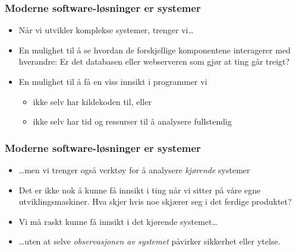 \documentclass{beamer}
\begin{document}
\begin{frame}
    \frametitle{Moderne software-løsninger er systemer}
\begin{itemize}

    \item Når vi utvikler komplekse systemer, trenger vi…

        \item En mulighet til å se hvordan de forskjellige komponentene interagerer med
        hverandre: Er det databasen eller webserveren som gjør at ting går treigt?

    \item En mulighet til å få en viss innsikt i programmer vi
        \begin{itemize}
            \item ikke selv har kildekoden til, eller
            \item ikke selv har tid og ressurser til å analysere fullstendig
            \end{itemize}

\end{itemize}
\end{frame}

\begin{frame}
    \frametitle{Moderne software-løsninger er systemer}
\begin{itemize}

    \item …men vi trenger også verktøy for å analysere \emph{kjørende} systemer

    \item  Det er ikke nok å kunne få innsikt i ting når vi sitter på våre egne
      utviklingsmaskiner. Hva skjer hvis noe skjærer seg i det ferdige produktet?
  \item Vi må raskt kunne få innsikt i det kjørende systemet…
  \item …uten at selve \emph{observasjonen av systemet} påvirker sikkerhet eller ytelse.
\end{itemize}
\end{frame}
\end{document}
